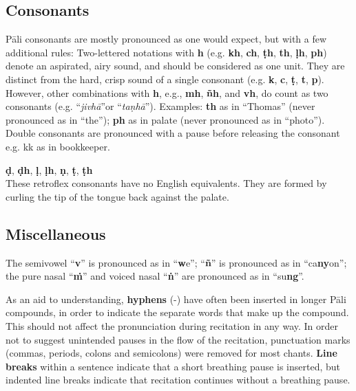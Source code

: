 
\subsection*{Consonants}

Pāli consonants are mostly pronounced as one would expect, but with a few additional rules:  Two-lettered notations with \textbf{h} (e.g. \textbf{kh}, \textbf{ch}, \textbf{ṭh}, \textbf{th}, \textbf{ḷh}, \textbf{ph}) denote an aspirated, airy sound, and should be considered as one unit. They are distinct from the hard, crisp sound of a single consonant (e.g. \textbf{k}, \textbf{c}, \textbf{ṭ}, \textbf{t}, \textbf{p}). However, other combinations with \textbf{h}, e.g., \textbf{mh}, \textbf{ñh}, and \textbf{vh}, do count as two consonants (e.g. ``\textit{jivhā}''or ``\textit{taṇhā}'').  Examples: \textbf{th} as in ``Thomas'' (never pronounced as in ``the''); \textbf{ph} as in palate (never pronounced as in ``photo''). \ifninebythirteenversion\clearpage\fi Double consonants are pronounced with a pause before releasing the consonant e.g. kk as in bookkeeper.

\textbf{ḍ}, \textbf{ḍh}, \textbf{ḷ}, \textbf{ḷh}, \textbf{ṇ}, \textbf{ṭ}, \textbf{ṭh}\\
These retroflex consonants have no English equivalents. They are formed by curling the tip of the tongue back against the palate.

\ifafiveversion\clearpage\fi

\subsection*{Miscellaneous}

The semivowel ``\textbf{v}'' is pronounced as in ``\textbf{w}e''; ``\textbf{ñ}'' is pronounced as in ``ca\textbf{ny}on''; the pure nasal ``\textbf{ṁ}'' and voiced nasal ``\textbf{ṅ}'' are pronounced as in ``su\textbf{ng}''.

As an aid to understanding, \textbf{hyphens} (-) have often been inserted in longer Pāli compounds, in order to indicate the separate words that make up the compound. This should not affect the pronunciation during recitation in any way. In order not to suggest unintended pauses in the flow of the recitation, punctuation marks (commas, periods, colons and semicolons) were removed for most chants. \textbf{Line breaks} within a sentence indicate that a short breathing pause is inserted, but indented line breaks indicate that recitation continues without a breathing pause.

